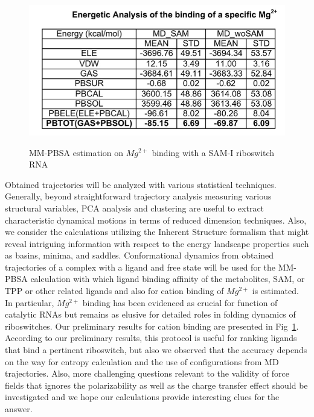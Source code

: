 \documentclass[a4paper,10pt]{article}
\newcommand{\up}{\vspace*{-1em}}
\begin{document}
\begin{figure}%
\begin{center}
  \includegraphics[scale=0.4]{mm-pbsa-mg}
   \caption{MM-PBSA estimation on ${Mg^{2+}}$ binding with a SAM-I riboswitch RNA}
\up\up
\label{fig:mm-pbsa-mg-table}
\end{center}
\end{figure}

Obtained trajectories will be analyzed with various statistical techniques.  Generally, beyond straightforward trajectory analysis measuring various structural variables, PCA analysis and clustering are useful to extract characteristic dynamical motions in terms of reduced dimension techniques\cite{kimjpcb2010, SAM-I-NAR2009}.   Also, we consider the calculations utilizing the Inherent Structure formalism that might reveal intriguing information with respect to the energy landscape properties such as basins, minima, and saddles\cite{kimpre2002,kimjcp2004}.  Conformational dynamics from obtained trajectories of a complex with a ligand and free state will be used for the MM-PBSA calculation with which ligand binding affinity of the metabolites, SAM, or TPP or other related ligands and also for cation binding of ${Mg^{2+}}$ is estimated.  In particular, ${Mg^{2+}}$ binding has been evidenced as crucial for function of catalytic RNAs but remains as elusive for detailed roles in folding dynamics of riboswitches.  Our preliminary results for cation binding are presented in Fig~\ref{fig:mm-pbsa-mg-table}.  According to our preliminary results, this protocol is useful for ranking ligands that bind a pertinent riboswitch, but also we observed that the accuracy depends on the way for entropy calculation and the use of configurations from MD trajectories.  Also, more challenging questions relevant to the validity of force fields that ignores the polarizability as well as the charge transfer effect should be investigated and we hope our calculations provide interesting clues for the answer.      
\end{document}
